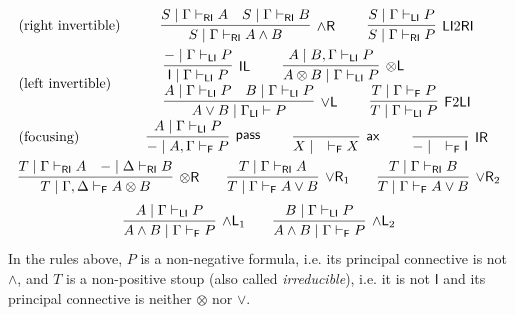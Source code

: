 \documentclass[submission,copyright,creativecommons]{eptcs}
\theoremstyle{definition}
\newcommand{\tl}{\otimes \mathsf{L}}
\newcommand{\tr}{\otimes \mathsf{R}}
\newcommand{\pass}{\mathsf{pass}}
\newcommand{\unitl}{\mathsf{IL}}
\newcommand{\unitr}{\mathsf{IR}}
\newcommand{\andlone}{\land \mathsf{L}_{1}}
\newcommand{\andltwo}{\land \mathsf{L}_{2}}
\newcommand{\andr}{\land \mathsf{R}}
\newcommand{\orl}{\lor \mathsf{L}}
\newcommand{\orrone}{\lor \mathsf{R}_{1}}
\newcommand{\orrtwo}{\lor \mathsf{R}_{2}}
\newcommand{\ax}{\mathsf{ax}}
\newcommand{\ot}{\otimes}
\newcommand{\I}{\mathsf{I}}
\newcommand{\RI}{\mathsf{RI}}
\newcommand{\LI}{\mathsf{LI}}
\newcommand{\F}{\mathsf{F}}
\newcommand{\proofbox}[1]{\begin{tabular}{l} #1 \end{tabular}}
\newcommand\niccolo[1]{\mbox{}
{\marginpar{\color{red}NV}}
{\sf\noindent\color{red}#1}}%
\begin{document}
\begin{equation}\label{eq:naive:focus}
  \begin{array}{lc}
    \text{(right invertible)} & %
    \proofbox{
      \infer[\andr]{S \mid \Gamma \vdash_{\RI} A \land B}{
        S \mid \Gamma \vdash_{\RI} A
        &
        S \mid \Gamma \vdash_{\RI} B
      }
    \qquad
    \infer[\LI 2 \RI]{S \mid \Gamma \vdash_{\RI} P}{S \mid \Gamma \vdash_{\LI} P}
    }
    \\[10pt]
    \text{(left invertible)} & %
    \proofbox{
      \infer[\unitl]{\I \mid \Gamma \vdash_{\LI} P}{{-} \mid \Gamma \vdash_{\LI} P}
    \qquad
    \infer[\tl]{A \ot B \mid \Gamma \vdash_{\LI} P}{A \mid B , \Gamma \vdash_{\LI} P}
    \\
    \infer[\orl]{A \lor B \mid \Gamma_\LI \vdash P}{
      A \mid \Gamma \vdash_\LI P
      &
      B \mid \Gamma \vdash_\LI P
    }
    \qquad
    \infer[\F 2 \LI]{T \mid \Gamma \vdash_{\LI} P}{T \mid \Gamma \vdash_{\F} P}
    }
    \\[10pt]
    \text{(focusing)} &    %
    \proofbox{
    \infer[\pass]{{-} \mid A , \Gamma \vdash_{\F} P }{
        A \mid \Gamma \vdash_{\LI} P
    }
    \qquad
    \infer[\ax]{X \mid \quad \vdash_{\F} X}{}
    \qquad
    \infer[\unitr]{{-} \mid \quad \vdash_{\F} \I}{}
    }
    \\[10pt]
    \multicolumn{2}{c}{
    \infer[\tr]{T \mid \Gamma , \Delta \vdash_{\F} A \ot B}{
      T \mid \Gamma \vdash_{\RI} A
      &
      {-} \mid \Delta \vdash_{\RI} B
    }
    \qquad
    \infer[\orrone]{T \mid \Gamma \vdash_{\F} A \lor B}{
      T \mid \Gamma \vdash_{\RI} A
    }
    \qquad
    \infer[\orrtwo]{T \mid \Gamma \vdash_{\F} A \lor B}{
      T \mid \Gamma \vdash_{\RI} B
    }
    }
    \\[6pt]
    \multicolumn{2}{c}{
    \infer[\andlone]{A \land B \mid \Gamma \vdash_{\F} P}{A \mid \Gamma \vdash_{\LI} P}
    \qquad
    \infer[\andltwo]{A \land B \mid \Gamma \vdash_{\F} P}{B \mid \Gamma \vdash_{\LI} P}
    }
  \end{array}
\end{equation}
In the rules above, $P$ is a non-negative formula, i.e. its principal connective is not $\land$, and $T$ is a non-positive stoup (also called \emph{irreducible}), i.e. it is not $\I$ and its principal connective is neither $\ot$ nor $\lor$.
\end{document}
